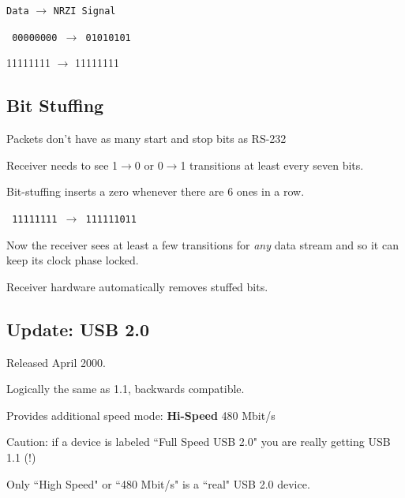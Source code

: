 {\tt Data} $\to$ {\tt NRZI Signal }

{\tt
00000000 $\to$  01010101

11111111 $\to$  11111111
}

\subsection{Bit Stuffing}

Packets don't have as many start and stop bits as RS-232

Receiver needs to see 1$\to$0 or 0$\to$1 transitions at
least every seven bits.

Bit-stuffing inserts a zero whenever there are 6 ones
in a row.

{\tt
11111111 $\to$  111111011
}

Now the receiver sees at least a few transitions for {\it any}
data stream and so it can keep its clock phase locked.

Receiver hardware automatically removes stuffed bits.

\subsection{Update: USB 2.0 }

Released April 2000.

Logically the same as 1.1, backwards compatible.

Provides additional speed mode:  {\bf Hi-Speed}  480 Mbit/s

Caution: if a device is labeled ``Full Speed USB 2.0" you are really getting USB 1.1 (!)

Only ``High Speed" or ``480 Mbit/s" is a ``real" USB 2.0 device.


%
